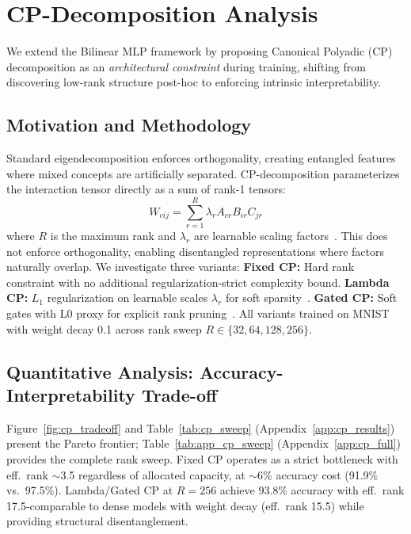 
\section{CP-Decomposition Analysis}
\label{sec:cp_extension}

We extend the Bilinear MLP framework by proposing Canonical Polyadic (CP) decomposition as an \emph{architectural constraint} during training, shifting from discovering low-rank structure post-hoc to enforcing intrinsic interpretability.

\subsection{Motivation and Methodology}

Standard eigendecomposition enforces orthogonality, creating entangled features where mixed concepts are artificially separated.
CP-decomposition parameterizes the interaction tensor directly as a sum of rank-1 tensors:
\begin{equation}
    W_{cij} = \sum_{r=1}^{R} \lambda_r A_{cr} B_{ir} C_{jr}
    \label{eq:cp_factorization}
\end{equation}
where $R$ is the maximum rank and $\lambda_r$ are learnable scaling factors~\citep{veeramacheneni2022canonical}.
This does not enforce orthogonality, enabling disentangled representations where factors naturally overlap.
We investigate three variants:
\textbf{Fixed CP:} Hard rank constraint with no additional regularization-strict complexity bound.
\textbf{Lambda CP:} $L_1$ regularization on learnable scales $\lambda_r$ for soft sparsity~\citep{veeramacheneni2022canonical}.
\textbf{Gated CP:} Soft gates with L0 proxy for explicit rank pruning~\citep{cao2024learning}.
All variants trained on MNIST with weight decay 0.1 across rank sweep $R \in \{32, 64, 128, 256\}$.

\subsection{Quantitative Analysis: Accuracy-Interpretability Trade-off}

Figure~\ref{fig:cp_tradeoff} and Table~\ref{tab:cp_sweep} (Appendix~\ref{app:cp_results}) present the Pareto frontier; Table~\ref{tab:app_cp_sweep} (Appendix~\ref{app:cp_full}) provides the complete rank sweep.
Fixed CP operates as a strict bottleneck with eff.\ rank $\sim$3.5 regardless of allocated capacity, at $\sim$6\% accuracy cost (91.9\% vs.\ 97.5\%).
Lambda/Gated CP at $R=256$ achieve 93.8\% accuracy with eff.\ rank 17.5-comparable to dense models with weight decay (eff.\ rank 15.5) while providing structural disentanglement.

